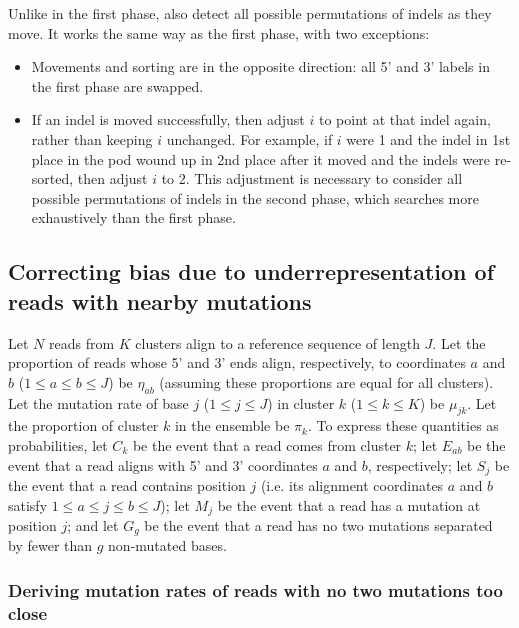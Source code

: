 \documentclass[11pt]{article}
\begin{document}
\begin{enumerate}
    Unlike in the first phase, also detect all possible permutations of indels as they move.
    It works the same way as the first phase, with two exceptions:
    \begin{itemize}
        \item Movements and sorting are in the opposite direction: all 5' and 3' labels in the first phase are swapped.
        \item If an indel is moved successfully, then adjust $i$ to point at that indel again, rather than keeping $i$ unchanged.
        For example, if $i$ were 1 and the indel in 1st place in the pod wound up in 2nd place after it moved and the indels were re-sorted, then adjust $i$ to 2.
        This adjustment is necessary to consider all possible permutations of indels in the second phase, which searches more exhaustively than the first phase.
    \end{itemize}
\end{enumerate}


\subsection{Correcting bias due to underrepresentation of reads with nearby mutations}
\label{bias-correction-algorithm}

Let $N$ reads from $K$ clusters align to a reference sequence of length $J$.
Let the proportion of reads whose 5' and 3' ends align, respectively, to coordinates $a$ and $b$ ($1 \le a \le b \le J$) be $\eta_{ab}$ (assuming these proportions are equal for all clusters). Let the mutation rate of base $j$ ($1 \le j \le J$) in cluster $k$ ($1 \le k \le K$) be $\mu_{jk}$.
Let the proportion of cluster $k$ in the ensemble be $\pi_k$.
To express these quantities as probabilities, let $C_k$ be the event that a read comes from cluster $k$; let $E_{ab}$ be the event that a read aligns with 5' and 3' coordinates $a$ and $b$, respectively; let $S_j$ be the event that a read contains position $j$ (i.e. its alignment coordinates $a$ and $b$ satisfy $1 \le a \le j \le b \le J$); let $M_j$ be the event that a read has a mutation at position $j$; and let $G_g$ be the event that a read has no two mutations separated by fewer than $g$ non-mutated bases.

\subsubsection{Deriving mutation rates of reads with no two mutations too close}
\label{calc_p_mut_noclose}
\end{document}
